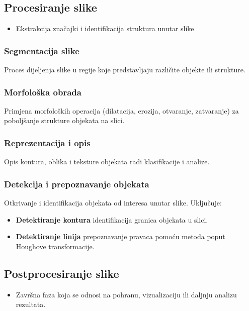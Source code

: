 \documentclass{foi}
\begin{document}
\subsection{Procesiranje slike}
\begin{itemize}
    \item Ekstrakcija značajki i identifikacija struktura unutar slike
\end{itemize}

\subsubsection{Segmentacija slike}
Proces dijeljenja slike u regije koje predstavljaju različite objekte ili strukture.

\subsubsection{Morfološka obrada}
Primjena morfoloških operacija (dilatacija, erozija, otvaranje, zatvaranje) za poboljšanje strukture objekata na slici.

\subsubsection{Reprezentacija i opis}
Opis kontura, oblika i teksture objekata radi klasifikacije i analize.

\subsubsection{Detekcija i prepoznavanje objekata}
Otkrivanje i identifikacija objekata od interesa unutar slike. Uključuje:
\begin{itemize}
    \item \textbf{Detektiranje kontura} identifikacija granica objekata u slici.
    \item \textbf{Detektiranje linija} prepoznavanje pravaca pomoću metoda poput Houghove transformacije.
\end{itemize}

\subsection{Postprocesiranje slike}
\begin{itemize}
    \item Završna faza koja se odnosi na pohranu, vizualizaciju ili daljnju analizu rezultata.
\end{itemize}
\end{document}
